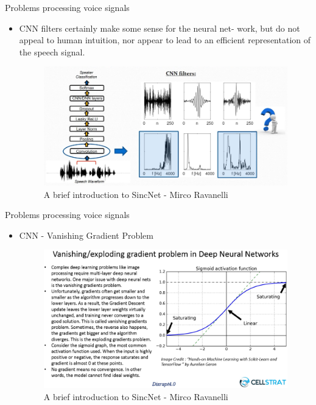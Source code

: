 \documentclass[notheorems, aspectratio=54]{beamer}
\begin{document}
\begin{frame}{Problems processing voice signals}
	\begin{itemize}
		\item CNN filters certainly make some sense for the neural net-
		work, but do not appeal to human intuition, nor appear to lead
		to an efficient representation of the speech signal.
		\begin{figure}[H]
			\includegraphics[width=0.95\linewidth]{images/interpretability_problems.png}
			\caption{A brief introduction to SincNet - Mirco Ravanelli}
			\label{fig:writing-thesis}
		\end{figure}
	\end{itemize}
\end{frame}
\begin{frame}{Problems processing voice signals}
	\begin{itemize}
		\item CNN - Vanishing Gradient Problem
		\begin{figure}[H]
			\includegraphics[width=0.95\linewidth]{images/Vanishing-Gradients-in-DNN.png}
			\caption{A brief introduction to SincNet - Mirco Ravanelli}
			\label{fig:writing-thesis}
		\end{figure}
	\end{itemize}
\end{frame}
\end{document}
